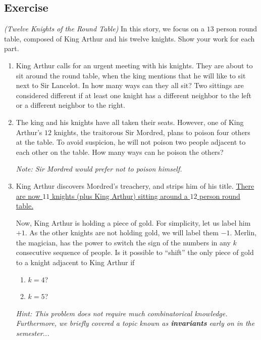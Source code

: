 \documentclass{article}
\newcounter{counter}
\newcommand{\Exercise}{Exercise \stepcounter{counter}\thecounter}
\begin{document}
\subsection*{\Exercise}
    \textit{(Twelve Knights of the Round Table)} In this story, we focus on a $13$ person round table, composed of King Arthur and his twelve knights. Show your work for each part.
    \begin{enumerate}
        \item King Arthur calls for an urgent meeting with his knights. They are about to sit around the round table, when the king mentions that he will like to sit next to Sir Lancelot. In how many ways can they all sit? Two sittings are considered different if at least one knight has a different neighbor to the left or a different neighbor to the right.
        \item The king and his knights have all taken their seats. However, one of King Arthur's $12$ knights, the traitorous Sir Mordred, plans to poison four others at the table. To avoid suspicion, he will not poison two people adjacent to each other on the table. How many ways can he poison the others?
        
        \vspace{1mm}\textit{Note: Sir Mordred would prefer not to poison himself.}
        \item King Arthur discovers Mordred's treachery, and strips him of his title. \ul{There are now $11$ knights (plus King Arthur) sitting around a $12$ person round table.}
        
        \vspace{1.5mm} \qquad Now, King Arthur is holding a piece of gold. For simplicity, let us label him $+1$. As the other knights are not holding gold, we will label them $-1$. Merlin, the magician, has the power to switch the sign of the numbers in any $k$ consecutive sequence of people. Is it possible to ``shift'' the only piece of gold to a knight adjacent to King Arthur if 
        \begin{enumerate}[label = \roman*.]
            \item $k = 4$?
            \item $k = 5$?
        \end{enumerate}
        
        \vspace{1mm}\textit{Hint: This problem does not require much combinatorical knowledge. Furthermore, we briefly covered a topic known as \textbf{invariants} early on in the semester...}
    \end{enumerate}
    
\end{document}
